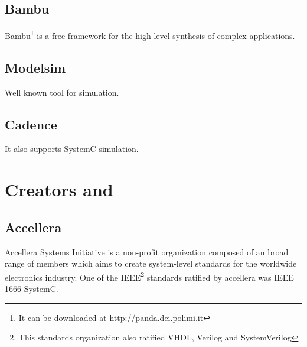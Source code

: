 \documentclass{article}
\begin{document}
	  \subsection{Bambu}
	  Bambu\footnote{It can be downloaded at http://panda.dei.polimi.it} is a free framework for the high-level synthesis of complex applications.
	  
	  \subsection{Modelsim}
	  Well known tool for simulation.
	  
	  \subsection{Cadence}
	  It also supports SystemC simulation.
	\section{Creators and }
	  \subsection{Accellera}
	  Accellera Systems Initiative is a non-profit organization composed of an broad range of members which aims to create system-level standards for the worldwide electronics industry.
	  One of the IEEE\footnote{This standards organization also ratified VHDL, Verilog and SystemVerilog} standards ratified by accellera was IEEE 1666 SystemC.
	  
\end{document}
